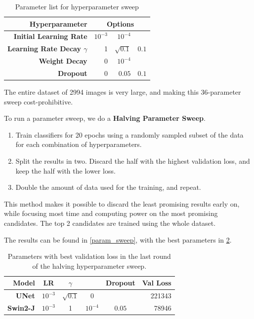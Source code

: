 \begin{table}[h]
	\centering
	\small
	\begin{tabular}{>{\bfseries}r | r r r}
		\toprule
		Hyperparameter & \multicolumn{3}{c}{Options} \\
		\midrule
		Initial Learning Rate & $10^{-3}$ & $10^{-4}$ & \\
		Learning Rate Decay $\gamma$ & 1 & $\sqrt{0.1}$ & $0.1$ \\
		\lt{} Weight Decay & $0$ & $10^{-4}$ & \\
		Dropout & 0 & $0.05$ & $0.1$ \\
		\bottomrule
	\end{tabular}
	\caption{Parameter list for hyperparameter sweep}
	\label{hyperparameter_list}
\end{table}

The entire dataset of 2994 images is very large, and making this 36-parameter sweep cost-prohibitive.

To run a parameter sweep, we do a \textbf{Halving Parameter Sweep}\cite{halving_param_sweep}.
\begin{enumerate}
	\item Train classifiers for 20 epochs using a randomly sampled subset of the data for each combination of hyperparameters.
	\item Split the results in two. Discard the half with the highest validation loss, and keep the half with the lower loss.
	\item Double the amount of data used for the training, and repeat.
\end{enumerate}

This method makes it possible to discard the least promising results early on, while focusing most time and computing power on the most promising candidates.
The top 2 candidates are trained using the whole dataset.

The results can be found in \cref{param_sweep}, with the best parameters in \cref{param_sweep_results}.

\begin{table}[h]
	\centering
	\small
	\begin{tabular}{>{\bfseries}r | c c c c | r}
		\toprule
		Model & LR & $\gamma$ & \lt{} & Dropout & Val Loss \\
		\midrule
		UNet & $10^{-3}$ & $\sqrt{0.1}$ & $0$ & & \num{221343} \\
		Swin2-J & $10^{-3}$ & 1 & $10^{-4}$ & $0.05$ & \num{78946} \\
		\bottomrule
	\end{tabular}
	\caption{Parameters with best validation loss in the last round of the halving hyperparameter sweep.}
	\label{param_sweep_results}
\end{table}

